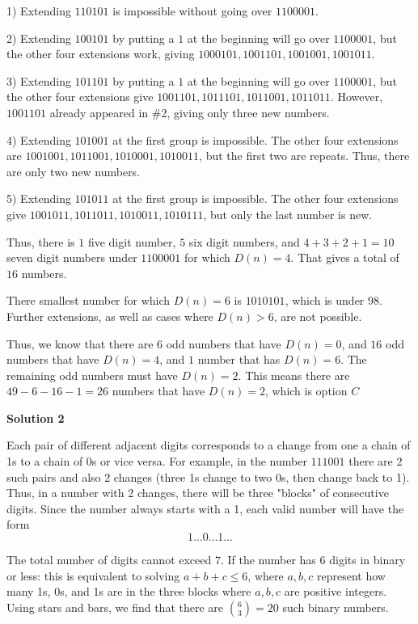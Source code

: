 \begin{enumerate}
 1)  Extending $110101$ is impossible without going over $1100001$.

 2)  Extending $100101$ by putting a $1$ at the beginning will go over $1100001$, but the other four extensions work, giving $1000101, 1001101, 1001001, 1001011$.

 3)  Extending $101101$ by putting a $1$ at the beginning will go over $1100001$, but the other four extensions give $1001101, 1011101, 1011001, 1011011$.  However, $1001101$ already appeared in \#2, giving only three new numbers.

 4)  Extending $101001$ at the first group is impossible.  The other four extensions are $1001001, 1011001, 1010001, 1010011$, but the first two are repeats.  Thus, there are only two new numbers.

 5)  Extending $101011$ at the first group is impossible.  The other four extensions give $1001011, 1011011, 1010011, 1010111$, but only the last number is new.

 Thus, there is $1$ five digit number, $5$ six digit numbers, and $4 + 3 + 2 + 1 = 10$ seven digit numbers under $1100001$ for which $D(n) = 4$.  That gives a total of $16$ numbers.

 There smallest number for which $D(n) = 6$ is $1010101$, which is under $98$.  Further extensions, as well as cases where $D(n) > 6$, are not possible.

 Thus, we know that there are $6$ odd numbers that have $D(n) = 0$, and $16$ odd numbers that have $D(n) = 4$, and $1$ number that has $D(n) = 6$.  The remaining odd numbers must have $D(n) = 2$.  This means there are $49 - 6 - 16 - 1 = 26$ numbers that have $D(n) = 2$, which is option $\boxed{C}$




\textbf{Solution 2}

Each pair of different adjacent digits corresponds to a change from one a chain of 1s to a chain of 0s or vice versa. For example, in the number $111001$ there are 2 such pairs and also 2 changes (three 1s change to two 0s, then change back to 1). Thus, in a number with 2 changes, there will be three "blocks" of consecutive digits. Since the number always starts with a 1, each valid number will have the form 
 \[1\dots0\dots1\dots\]

 The total number of digits cannot exceed $7$. If the number has 6 digits in binary or less: this is equivalent to solving $a+b+c \le 6$, where $a, b, c$ represent how many 1s, 0s, and 1s are in the three blocks where $a, b, c$ are positive integers. Using stars and bars, we find that there are $\binom{6}{3}=20$ such binary numbers.


\end{enumerate}
